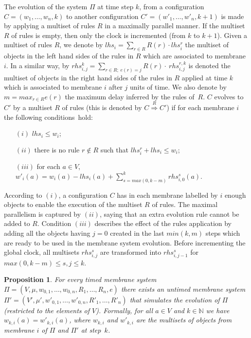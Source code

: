 \documentclass{eptcs}
\newtheorem{proposition}{Proposition}
\begin{document}
The evolution of the system $\Pi$ at time step $k$, from a
configuration $C=(w_1,\ldots,w_n,k)$ to another configuration
$C'=(w'_1,\ldots,w'_n,k+1)$ is made by applying
a multiset of rules $R$ in a maximally parallel manner.
If the multiset $R$ of rules is empty, then
only the clock is incremented (from $k$ to $k+1$).
Given a multiset of rules $R$,
we denote by $lhs_i=\sum_{r\in R} R(r) \cdot lhs^r_i$ the multiset
of objects in the left hand sides of the rules in $R$ which are
associated to membrane $i$. In a similar way, by
$rhs_{i,j}^k = \sum_{r\in R;\;e(r)=j} R(r)\cdot~rhs^{r,k}_{i,j}$ is
denoted the multiset of objects in the right hand sides of the rules
in $R$ applied at time $k$ which is associated to membrane $i$ after
$j$ units of time. We also denote by $m=max_{r\in R}e(r)$ the
maximum delay inferred by the rules of~$R$. $C$ evolves to $C'$ by a
multiset $R$ of rules (this is denoted by
$C\stackrel{R}{\Longrightarrow}C'$) if for each membrane $i$ the
following conditions~hold:
\begin{enumerate}
\item[$(i)$] $lhs_i \leq w_i$;
\item[$(ii)$] there is no rule $r\not \in R$ such that
$lhs_i^r+ lhs_i\leq w_i$;
\item[$(iii)$] for each $a\in V$, $w'_i(a)=w_i(a)-lhs_i(a)+
\sum^{k}_{s=max(0,k-m)} rhs^s_{i,0}(a)$.
\end{enumerate}
According to $(i)$, a configuration $C$ has in each membrane labelled by $i$
enough objects to enable the execution of the multiset $R$ of rules.
The maximal parallelism is captured by $(ii)$, saying that an extra
evolution rule cannot be added to $R$. Condition $(iii)$ describes
the effect of the rules application by adding all the objects having
$j=0$ created in the last $min(k,m)$ steps which are ready to be
used in the membrane system evolution. Before incrementing the
global clock, all multisets $rhs^s_{i,j}$ are transformed into
$rhs^{s}_{i,j-1}$ for $max(0,k-m) \leq s,j \leq k$.

\begin{proposition}\label{tPtoP}
For every timed membrane system $\Pi=(V,\mu,w_{0,1},\ldots,w_{0,n},
R_1, \ldots, R_n, e)$ there exists an untimed membrane system
$\Pi'=(V',\mu',w'_{0,1},\ldots,w'_{0,n},R'_1,\ldots,R'_n)$ that
simulates the evolution of $\Pi$ (restricted to the elements of
$V$). Formally, for all $a\in V$ and $k \in \mathds{N}$ we have
$w_{k,i}(a)=w'_{k,i}(a)$, where $w_{k,i}$ and $w'_{k,i}$ are the multisets of
objects from membrane $i$ of $\Pi$ and $\Pi'$ at step~$k$.
\end{proposition}
\end{document}
